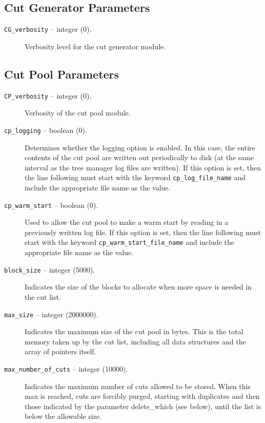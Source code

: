 \subsection{Cut Generator Parameters}

\begin{description}

\item[{\tt CG\_verbosity} -- integer (0).]
Verbosity level for the cut generator module.

\end{description}

\subsection{Cut Pool Parameters}
\label{cut_pool_params}
\begin{description}

\item[{\tt CP\_verbosity} -- integer (0).]
Verbosity of the cut pool module.

\item[{\tt cp\_logging} -- boolean (0).]
Determines whether the logging option is enabled. In this case, the
entire contents of the cut pool are written out periodically to disk
(at the same interval as the tree manager log files are written). If
this option is set, then the line following must start with the
keyword {\tt cp\_log\_file\_name} and include the appropriate
file name as the value.

\item[{\tt cp\_warm\_start} -- boolean (0).]
Used to allow the cut pool to make a warm start by reading in a
previously written log file. If
this option is set, then the line following must start with the
keyword {\tt cp\_warm\_start\_file\_name} and include the appropriate
file name as the value.

\item[{\tt block\_size} -- integer (5000).]
Indicates the size of the blocks to allocate when more space is needed
in the cut list.

\item[{\tt max\_size} -- integer (2000000).]
Indicates the maximum size of the cut pool in bytes. This is the total
memory taken up by the cut list, including all data structures and the
array of pointers itself.

\item[{\tt max\_number\_of\_cuts} -- integer (10000).]
Indicates the maximum number of cuts allowed to be stored. When this
max is reached, cuts are forcibly purged, starting with duplicates
and then those indicated by the parameter 
{delete_which} (see below), until the list is below the allowable size.


\end{description}
